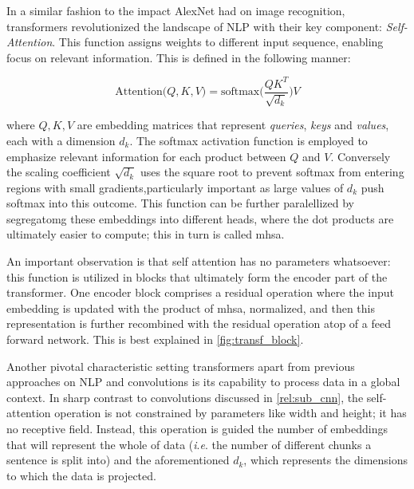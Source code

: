 In a similar fashion to the impact AlexNet had on image recognition, transformers revolutionized 
the landscape of NLP with their key component: \emph{Self-Attention}. This function assigns 
weights to different input sequence, enabling focus on relevant information. 
This is defined in the following manner:

\begin{equation}
    \mbox{Attention(}Q, K, V) = \mbox{softmax(}\frac{QK^T}{\sqrt{d_k}})V
    \label{eq:att}
\end{equation}

\noindent where $Q, K, V$ are embedding matrices that represent \emph{queries}, \emph{keys} and 
\emph{values}, each with a dimension $d_k$. The softmax activation function is employed to 
emphasize relevant information for each product between $Q$ and $V$. Conversely the scaling 
coefficient $\sqrt{d_k}$ uses the square root to prevent softmax from entering regions with small 
gradients,particularly important as large values of $d_k$ push softmax into this outcome. This 
function can be further paralellized by segregatomg these embeddings into different 
heads, where the dot products are ultimately easier to compute; this in turn is called \gls{mhsa}.

An important observation is that self attention has no parameters whatsoever: this function is 
utilized in blocks that ultimately form the encoder part of the transformer. One encoder block 
comprises a residual operation where the input embedding is updated with the product of \gls{mhsa}, 
normalized, and then this representation is further recombined with the residual operation atop of 
a feed forward network. This is best explained in \autoref{fig:transf_block}.



Another pivotal characteristic setting transformers apart from previous approaches on NLP 
and convolutions is its capability to process data in a global context. In sharp contrast to 
convolutions discussed in \autoref{rel:sub_cnn}, the self-attention operation is not constrained by 
parameters like width and height; it has no receptive field. Instead, this operation is guided 
the number of embeddings that will represent the whole of data (\textit{i}.\textit{e}. the number 
of different chunks a sentence is split into) and the aforementioned $d_k$, which represents the 
dimensions to which the data is projected. 

